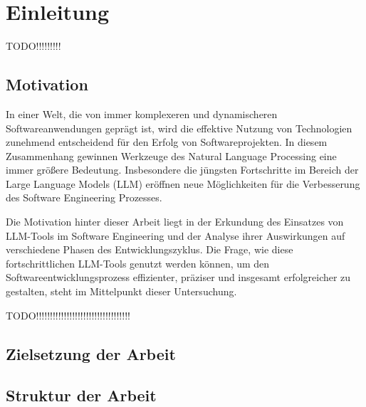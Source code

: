 
\chapter{Einleitung} 

TODO!!!!!!!!!

\section{Motivation}  \label{Motivation}

In einer Welt, die von immer komplexeren und dynamischeren Softwareanwendungen geprägt ist, wird die effektive Nutzung von Technologien zunehmend entscheidend für den Erfolg von  
Softwareprojekten. In diesem Zusammenhang gewinnen Werkzeuge des Natural Language Processing eine immer größere Bedeutung. Insbesondere die jüngsten Fortschritte im Bereich der Large  
Language Models (LLM) eröffnen neue Möglichkeiten für die Verbesserung des Software Engineering Prozesses.

Die Motivation hinter dieser Arbeit liegt in der Erkundung des Einsatzes von LLM-Tools im Software Engineering und der Analyse ihrer Auswirkungen auf verschiedene Phasen des  
Entwicklungszyklus. Die Frage, wie diese fortschrittlichen LLM-Tools genutzt werden können, um den Softwareentwicklungsprozess effizienter, präziser und insgesamt erfolgreicher zu  
gestalten, steht im Mittelpunkt dieser Untersuchung. 

TODO!!!!!!!!!!!!!!!!!!!!!!!!!!!!!!!!!!

\section{Zielsetzung der Arbeit}  \label{Zielsetzung der Arbeit}

\section{Struktur der Arbeit}  \label{Struktur der Arbeit}


